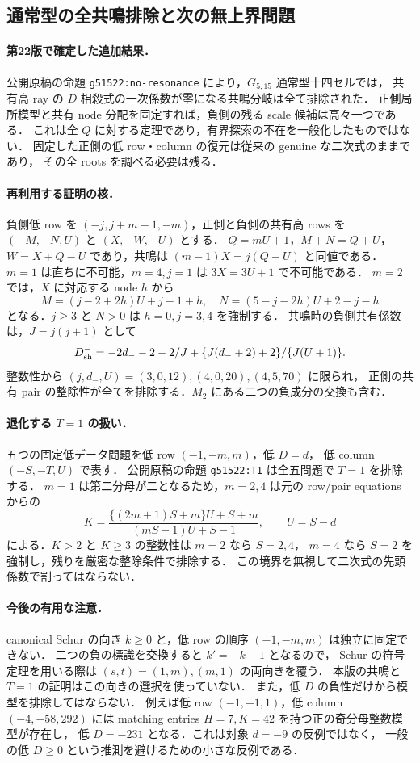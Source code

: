 \subsection{通常型の全共鳴排除と次の無上界問題}
\label{notes:g51522}

\paragraph{第22版で確定した追加結果．}
公開原稿の命題 \texttt{g51522:no-resonance} により，$G_{5,15}$ 通常型十四セルでは，
共有高 ray の $D$ 相殺式の一次係数が零になる共鳴分岐は全て排除された．
正側局所模型と共有 node 分配を固定すれば，負側の残る scale 候補は高々一つである．
これは全 $Q$ に対する定理であり，有界探索の不在を一般化したものではない．
固定した正側の低 row・column の復元は従来の genuine な二次式のままであり，
その全 roots を調べる必要は残る．

\paragraph{再利用する証明の核．}
負側低 row を $(-j,j+m-1,-m)$，正側と負側の共有高 rows を
$(-M,-N,U)$ と $(X,-W,-U)$ とする．
$Q=mU+1$，$M+N=Q+U$，$W=X+Q-U$ であり，共鳴は
$(m-1)X=j(Q-U)$ と同値である．$m=1$ は直ちに不可能，$m=4,j=1$ は
$3X=3U+1$ で不可能である．
$m=2$ では，$X$ に対応する node $h$ から
\[
 M=(j-2+2h)U+j-1+h,\quad
 N=(5-j-2h)U+2-j-h
\]
となる．$j\ge3$ と $N>0$ は $h=0,j=3,4$ を強制する．
共鳴時の負側共有係数は，$J=j(j+1)$ として
\[
 D_{\rm sh}^-=-2d_--2-2/J+
 \{J(d_-+2)+2\}/\{J(U+1)\}.
\]
整数性から $(j,d_-,U)=(3,0,12),(4,0,20),(4,5,70)$ に限られ，
正側の共有 pair の整除性が全てを排除する．$M_2$ にある二つの負成分の交換も含む．

\paragraph{退化する $T=1$ の扱い．}
五つの固定低データ問題を低 row $(-1,-m,m)$，低 $D=d$，
低 column $(-S,-T,U)$ で表す．
公開原稿の命題 \texttt{g51522:T1} は全五問題で $T=1$ を排除する．
$m=1$ は第二分母が二となるため，$m=2,4$ は元の row/pair equations からの
\[
 K=\frac{\{(2m+1)S+m\}U+S+m}{(mS-1)U+S-1},\qquad U=S-d
\]
による．$K>2$ と $K\ge3$ の整数性は $m=2$ なら $S=2,4$，
$m=4$ なら $S=2$ を強制し，残りを厳密な整除条件で排除する．
この境界を無視して二次式の先頭係数で割ってはならない．

\paragraph{今後の有用な注意．}
canonical Schur の向き $k\ge0$ と，低 row の順序 $(-1,-m,m)$ は独立に固定できない．
二つの負の標識を交換すると $k'=-k-1$ となるので，
Schur の符号定理を用いる際は $(s,t)=(1,m),(m,1)$ の両向きを覆う．
本版の共鳴と $T=1$ の証明はこの向きの選択を使っていない．
また，低 $D$ の負性だけから模型を排除してはならない．
例えば低 row $(-1,-1,1)$，低 column $(-4,-58,292)$ には
matching entries $H=7,K=42$ を持つ正の奇分母整数模型が存在し，
低 $D=-231$ となる．これは対象 $d=-9$ の反例ではなく，
一般の低 $D\ge0$ という推測を避けるための小さな反例である．

